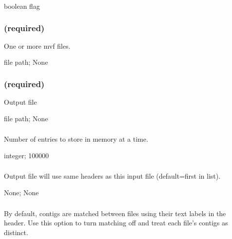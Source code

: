 \documentclass[letterpaper,11pt,english]{sphinxmanual}
\begin{document}
 boolean flag


\subsubsection{ (required)}
\label{\detokenize{prog_desc:id122}}
 One or more mvf files.

 file path;  None


\subsubsection{ (required)}
\label{\detokenize{prog_desc:id123}}
 Output file

 file path;  None


\subsubsection{}
\label{\detokenize{prog_desc:id124}}
 Number of entries to store in memory at a time.

 integer;  100000


\subsubsection{}
\label{\detokenize{prog_desc:main-header-file-mainheaderfile}}
 Output file will use same headers as this input file (default=first in list).

 None;  None


\subsubsection{}
\label{\detokenize{prog_desc:new-contigs-newcontigs}}
 By default, contigs are matched between files using their text labels in the header. Use this option to turn matching off and treat each file’s contigs as distinct.
\end{document}

